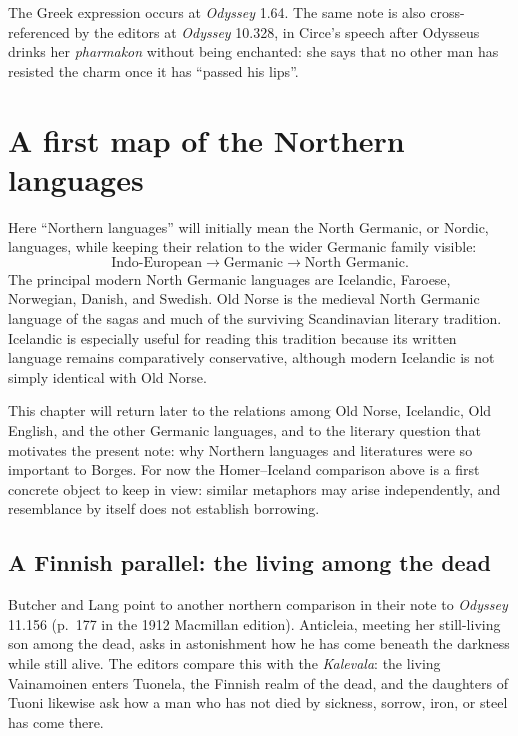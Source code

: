 The Greek expression occurs at \emph{Odyssey} 1.64. The same note is also
cross-referenced by the editors at \emph{Odyssey} 10.328, in Circe's speech
after Odysseus drinks her \emph{pharmakon} without being enchanted: she says
that no other man has resisted the charm once it has ``passed his lips''.

\section{A first map of the Northern languages}
\label{section-northern-languages}

Here ``Northern languages'' will initially mean the North Germanic, or Nordic,
languages, while keeping their relation to the wider Germanic family visible:
\[
\text{Indo-European}\to\text{Germanic}\to\text{North Germanic}.
\]
The principal modern North Germanic languages are Icelandic, Faroese,
Norwegian, Danish, and Swedish. Old Norse is the medieval North Germanic
language of the sagas and much of the surviving Scandinavian literary
tradition. Icelandic is especially useful for reading this tradition because
its written language remains comparatively conservative, although modern
Icelandic is not simply identical with Old Norse.

This chapter will return later to the relations among Old Norse, Icelandic,
Old English, and the other Germanic languages, and to the literary question
that motivates the present note: why Northern languages and literatures were
so important to Borges. For now the Homer--Iceland comparison above is a
first concrete object to keep in view: similar metaphors may arise
independently, and resemblance by itself does not establish borrowing.

\subsection{A Finnish parallel: the living among the dead}
\label{subsection-finnish-parallel}

Butcher and Lang point to another northern comparison in their note to
\emph{Odyssey} 11.156 (p.~177 in the 1912 Macmillan edition). Anticleia,
meeting her still-living son among the dead, asks in astonishment how he has
come beneath the darkness while still alive. The editors compare this with
the \emph{Kalevala}: the living Vainamoinen enters Tuonela, the Finnish realm
of the dead, and the daughters of Tuoni likewise ask how a man who has not
died by sickness, sorrow, iron, or steel has come there.

